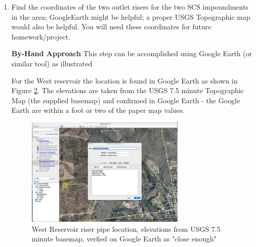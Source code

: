 \documentclass[12pt]{article}
\begin{document}
\begin{enumerate}
\textbf{By-Hand Approach}
The entire watershed area can be computed by manual or numerical planimetry, or counting the squares contained within the watershed.   Each square on the figure represents an area of approximately 0.01 mi$^2$.

Figure \ref{fig:ES2-WatershedArea-2} is a scanned image of the watershed with various square counts.  The estimated area is 16.93 square miles.   This is the total drainage area including all catchments.  The sub-catchment area determinations portions are not shown on this exhibit.  

\begin{figure}[h!] %
   \centering
   \texttt{[image: Scan.png]} 
   \caption{Study Area -- with grid overlay, outlet (Blue Dot), and subcatchments identified.  Various flow paths are indicted in transparent blue.  1,693 Squares counted to estimate watershed area.}
   \label{fig:ES2-WatershedArea-2}
\end{figure}

\clearpage

\item Find the coordinates of the two outlet risers for the two SCS impoundments in the area; GoogleEarth might be helpful; a proper USGS Topographic map would also be helpful.  You will need these coordinates for future homework/project.

\textbf{By-Hand Approach}
This step can be accomplished using Google Earth (or similar tool) as illustrated

For the West reservoir the location is found in Google Earth as shown in Figure \ref{fig:WestBasin}.  The elevations are taken from the USGS 7.5 minute Topographic Map (the supplied basemap) and confirmed in Google Earth - the Google Earth are within a foot or two of the paper map values.

\begin{figure}[h!] %
   \centering
   \includegraphics[width=3in]{WestReservoir.png} 
   \caption{West Reservoir riser pipe location, elevations from USGS 7.5 minute basemap, verfied on Google Earth as "close enough"}
   \label{fig:WestBasin}
\end{figure}


\end{enumerate}
\end{document}
